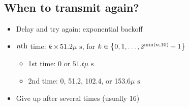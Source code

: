 \subsection{When to transmit again?}
\begin{itemize}
    \item Delay and try again: exponential backoff
    \item $n\text{th}$ time: $k\times51.2\mu\text{ s}$, for $k\in\left\{0,1,\dots,2^{\min(n,10)} - 1\right\}$
          \begin{itemize}
              \item 1st time: 0 or $51.t\mu\text{ s}$
              \item 2nd time: 0, 51.2, 102.4, or 153.6$\mu\text{ s}$
          \end{itemize}
    \item Give up after several times (usually 16)
\end{itemize}